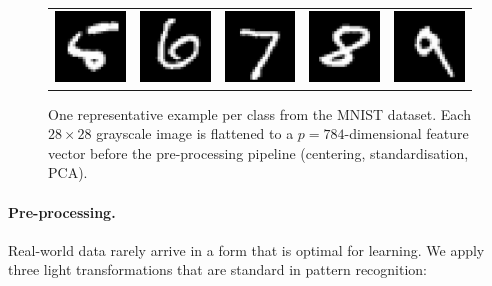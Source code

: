 \documentclass[twocolumn]{article} %
\begin{document}
\begin{figure}[htbp]
\begin{tabular}{ccccc}
    \includegraphics[width=0.18\linewidth]{figures/digits/digits_5.png} & %
    \includegraphics[width=0.18\linewidth]{figures/digits/digits_6.png} & %
    \includegraphics[width=0.18\linewidth]{figures/digits/digits_7.png} & %
    \includegraphics[width=0.18\linewidth]{figures/digits/digits_8.png} & %
    \includegraphics[width=0.18\linewidth]{figures/digits/digits_9.png}   %
  \end{tabular}
  \caption{One representative example per class from the MNIST
           dataset.  Each \(28\times28\) grayscale image is flattened to a
           \(p=784\)-dimensional feature vector before the
           pre-processing pipeline (centering, standardisation, PCA).}
  \label{fig:mnist-examples}
\end{figure}

\paragraph{Pre-processing.}
Real-world data rarely arrive in a form that is optimal for learning.
We apply three light transformations that are standard in pattern
recognition:
\end{document}
